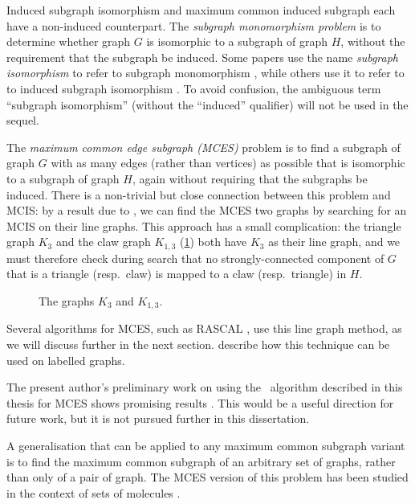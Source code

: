 Induced subgraph isomorphism and maximum common induced subgraph each have a
non-induced counterpart. The \emph{subgraph monomorphism problem} is to
determine whether graph $G$ is isomorphic to a subgraph of graph $H$, without
the requirement that the subgraph be induced.  Some papers use the name
\emph{subgraph isomorphism} to refer to subgraph monomorphism
\citep{DBLP:conf/cp/McCreeshP15}, while others use it to refer to to induced
subgraph isomorphism \citep{DBLP:journals/pami/CarlettiFSV18}.  To avoid
confusion, the ambiguous term ``subgraph isomorphism'' (without the ``induced''
qualifier) will not be used in the sequel.

The \emph{maximum common edge subgraph (MCES)} problem is to find a subgraph of
graph $G$ with as many edges (rather than vertices) as possible that is
isomorphic to a subgraph of graph $H$, again without requiring that the
subgraphs be induced.  There is a non-trivial but close connection between this
problem and MCIS: by a result due to \citet{whitney1932congruent}, we can find
the MCES two graphs by searching for an MCIS on their line graphs.  This
approach has a small complication: the triangle graph $K_3$ and the claw graph
$K_{1,3}$ (\cref{fig:k3-and-claw}) both have $K_3$ as their line graph, and we
must therefore check during search that no strongly-connected component of $G$
that is a triangle (resp.\ claw) is mapped to a claw (resp.\ triangle) in $H$.

\begin{figure}[htb]
    \centering
    
    \caption{The graphs $K_3$ and $K_{1,3}$.}
    \label{fig:k3-and-claw}
\end{figure}

Several algorithms for MCES, such as RASCAL
\citep{DBLP:journals/cj/RaymondGW02}, use this line graph method, as we will discuss further
in the next section.  \citet{DBLP:conf/mco/VismaraV08} describe how this technique
can be used on labelled graphs.

The present author's preliminary work on using the \McSplit\ algorithm
described in this thesis for MCES shows promising results
\citep{trimble2018three}. This would be a useful direction for future work, but
it is not pursued further in this dissertation.

A generalisation that can be applied to any maximum common subgraph
variant is to find the maximum common subgraph of an arbitrary set of graphs,
rather than only of a pair of graph.  The MCES version of this problem has
been studied in the context of sets of molecules
\citep{DBLP:journals/jcheminf/DalkeH13}.

